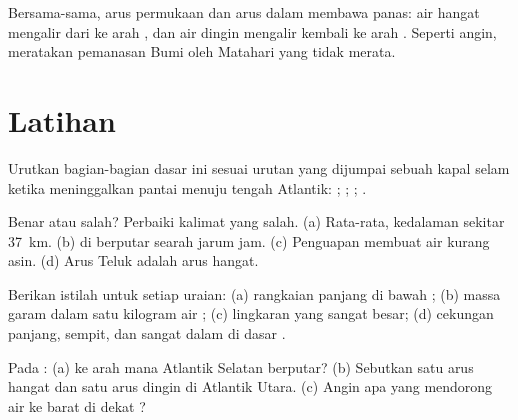 Bersama-sama, arus permukaan dan arus dalam membawa panas: air hangat
mengalir dari  ke arah , dan air dingin mengalir kembali
ke arah . Seperti angin,  meratakan pemanasan Bumi oleh
Matahari yang tidak merata.

\section{Latihan}

\begin{exercise}[$\star$]\label{exo:g8:the-oceans:1}
Urutkan bagian-bagian dasar  ini sesuai urutan yang dijumpai
sebuah kapal selam ketika meninggalkan pantai menuju tengah Atlantik:
; ; ; .
\end{exercise}

\begin{exercise}[$\star$]\label{exo:g8:the-oceans:2}
Benar atau salah? Perbaiki kalimat yang salah. (a) Rata-rata, kedalaman
 sekitar \qty{37}{km}. (b)  di 
berputar searah jarum jam. (c) Penguapan membuat air  kurang asin.
(d) Arus Teluk adalah arus hangat.
\end{exercise}

\begin{exercise}[$\star$]\label{exo:g8:the-oceans:3}
Berikan istilah untuk setiap uraian: (a) rangkaian panjang  di
bawah ; (b) massa garam dalam satu kilogram air ; (c) lingkaran
 yang sangat besar; (d) cekungan panjang, sempit, dan sangat
dalam di dasar .
\end{exercise}

\begin{exercise}[$\star$]\label{exo:g8:the-oceans:4}
Pada  : (a) ke arah mana  Atlantik Selatan
berputar? (b) Sebutkan satu arus hangat dan satu arus dingin di Atlantik
Utara. (c) Angin apa yang mendorong air ke barat di dekat ?
\end{exercise}

